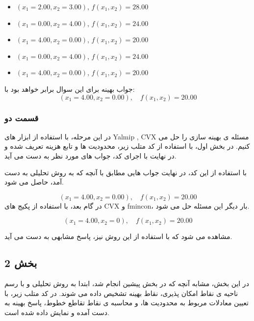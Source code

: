 	\begin{itemize}
		\item \( (x_1 = 2.00, x_2 = 3.00) \), \( f(x_1, x_2) = 28.00 \)
		\item \( (x_1 = 0.00, x_2 = 4.00) \), \( f(x_1, x_2) = 24.00 \)
		\item \( (x_1 = 4.00, x_2 = 0.00) \), \( f(x_1, x_2) = 20.00 \)
		\item \( (x_1 = 0.00, x_2 = 4.00) \), \( f(x_1, x_2) = 24.00 \)
		\item \( (x_1 = 4.00, x_2 = 0.00) \), \( f(x_1, x_2) = 20.00 \)
	\end{itemize}
	
جواب بهینه برای این سوال برابر خواهد بود با:
	\[
	(x_1 = 4.00, x_2 = 0.00) , \quad f(x_1, x_2) = 20.00
	\]
\subsubsection{قسمت دو}
در این مرحله، با استفاده از ابزار های 
Yalmip
, 
CVX
مسئله ی بهینه سازی را حل می کنیم. در بخش اول، با استفاده از کد متلب زیر، محدودیت ها و تابع هزینه تعریف شده و در نهایت با اجرای کد، جواب های مورد نظر به دست می آید.


با استفاده از این کد، در نهایت جواب هایی مطابق با آنچه که به روش تحلیلی به دست آمد، حاصل می شود.

\[
(x_1 = 4.00, x_2 = 0.00) , \quad f(x_1, x_2) = 20.00
\]
در گام بعد، با استفاده از پکیج های CVX و fmincon، بار دیگر این مسئله حل می شود.



\[
(x_1 = 4.00, x_2 = 0) , \quad f(x_1, x_2) = 20.00
\]

مشاهده می شود که با استفاده از این روش نیز، پاسخ مشابهی به دست می آید.

\subsection{بخش 2}
در این بخش، مشابه آنچه که در بخش پیشین انجام شد، ابتدا به روش تحلیلی و با رسم ناحیه ی نقاط امکان پذیری، نقاط بهینه تشخیص داده می شوند.
در کد متلب زیر، با تعیین معادلات مربوط به محدودیت ها، و محاسبه ی نقاط تقاطع خطوط، پاسخ بهینه به دست آمده و نمایش داده شده است.




